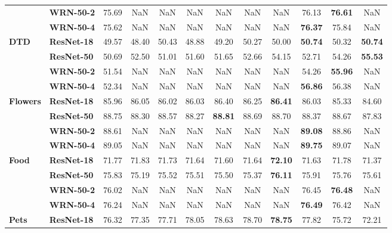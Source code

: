\begin{table}
\begin{tabular}{l|l|cccccccccc}
       & \textbf{WRN-50-2} &             75.69 &   NaN &   NaN &   NaN &   NaN &   NaN &   NaN & 76.13 & \textbf{76.61} &   NaN \\
       & \textbf{WRN-50-4} &             75.62 &   NaN &   NaN &   NaN &   NaN &   NaN &   NaN & \textbf{76.37} & 75.84 &   NaN \\
\cline{1-12}
\multirow{4}{*}{\textbf{DTD}} & \textbf{ResNet-18} &             49.57 & 48.40 & 50.43 & 48.88 & 49.20 & 50.27 & 50.00 & \textbf{50.74} & 50.32 & \textbf{50.74} \\
       & \textbf{ResNet-50} &             50.69 & 52.50 & 51.01 & 51.60 & 51.65 & 52.66 & 54.15 & 52.71 & 54.26 & \textbf{55.53} \\
       & \textbf{WRN-50-2} &             51.54 &   NaN &   NaN &   NaN &   NaN &   NaN &   NaN & 54.26 & \textbf{55.96} &   NaN \\
       & \textbf{WRN-50-4} &             52.34 &   NaN &   NaN &   NaN &   NaN &   NaN &   NaN & \textbf{56.86} & 56.38 &   NaN \\
\cline{1-12}
\multirow{4}{*}{\textbf{Flowers}} & \textbf{ResNet-18} &             85.96 & 86.05 & 86.02 & 86.03 & 86.40 & 86.25 & \textbf{86.41} & 86.03 & 85.33 & 84.60 \\
       & \textbf{ResNet-50} &             88.75 & 88.30 & 88.57 & 88.27 & \textbf{88.81} & 88.69 & 88.70 & 88.37 & 88.67 & 87.83 \\
       & \textbf{WRN-50-2} &             88.61 &   NaN &   NaN &   NaN &   NaN &   NaN &   NaN & \textbf{89.08} & 88.86 &   NaN \\
       & \textbf{WRN-50-4} &             89.05 &   NaN &   NaN &   NaN &   NaN &   NaN &   NaN & \textbf{89.75} & 89.07 &   NaN \\
\cline{1-12}
\multirow{4}{*}{\textbf{Food}} & \textbf{ResNet-18} &             71.77 & 71.83 & 71.73 & 71.64 & 71.60 & 71.64 & \textbf{72.10} & 71.63 & 71.78 & 71.37 \\
       & \textbf{ResNet-50} &             75.83 & 75.19 & 75.52 & 75.51 & 75.50 & 75.37 & \textbf{76.11} & 75.91 & 75.76 & 75.61 \\
       & \textbf{WRN-50-2} &             76.02 &   NaN &   NaN &   NaN &   NaN &   NaN &   NaN & 76.45 & \textbf{76.48} &   NaN \\
       & \textbf{WRN-50-4} &             76.24 &   NaN &   NaN &   NaN &   NaN &   NaN &   NaN & \textbf{76.49} & 76.42 &   NaN \\
\cline{1-12}
\multirow{4}{*}{\textbf{Pets}} & \textbf{ResNet-18} &             76.32 & 77.35 & 77.71 & 78.05 & 78.63 & 78.70 & \textbf{78.75} & 77.82 & 75.72 & 72.21 \\

\end{tabular}
\end{table}
